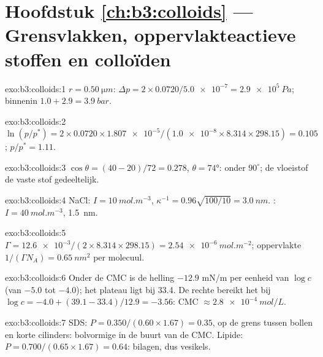\section*{Hoofdstuk \ref{ch:b3:colloids} --- Grensvlakken, oppervlakteactieve stoffen en colloïden}

\begin{solution}{exo:b3:colloids:1}
$r = \qty{0.50}{\micro m}$: $\Delta p = 2 \times 0.0720/\num{5.0e-7} = \qty{2.9e5}{Pa}$; binnenin $1.0 + 2.9 = \qty{3.9}{bar}$.
\end{solution}

\begin{solution}{exo:b3:colloids:2}
$\ln(p/p^*) = 2 \times 0.0720 \times \num{1.807e-5}/(\num{1.0e-8} \times 8.314 \times 298.15) = 0.105$; $p/p^* = 1.11$.
\end{solution}

\begin{solution}{exo:b3:colloids:3}
$\cos\theta = (40 - 20)/72 = 0.278$, $\theta = \ang{74}$: onder $90^\circ$; de vloeistof  de
vaste stof gedeeltelijk.
\end{solution}

\begin{solution}{exo:b3:colloids:4}
NaCl: $I = \qty{10}{mol.m^{-3}}$, $\kappa^{-1} = 0.96\sqrt{100/10} = \qty{3.0}{nm}$. : $I = \qty{40}{mol.m^{-3}}$, \qty{1.5}{nm}.
\end{solution}

\begin{solution}{exo:b3:colloids:5}
$\Gamma = \num{12.6e-3}/(2 \times 8.314 \times 298.15) = \qty{2.54e-6}{mol.m^{-2}}$; oppervlakte $1/(\Gamma N_A) =
\qty{0.65}{nm^2}$ per molecuul.
\end{solution}

\begin{solution}{exo:b3:colloids:6}
Onder de CMC is de helling $-12.9$ \unit{mN/m} per eenheid van $\log c$ (van $-5.0$ tot $-4.0$); het
plateau ligt bij 33.4. De rechte bereikt het bij $\log c = -4.0 + (39.1 - 33.4)/12.9 = -3.56$: CMC
$\approx \qty{2.8e-4}{mol/L}$.
\end{solution}

\begin{solution}{exo:b3:colloids:7}
SDS: $P = 0.350/(0.60 \times 1.67) = 0.35$, op de grens tussen bollen en korte cilinders:
bolvormige  in de buurt van de CMC. Lipide: $P = 0.700/(0.65 \times 1.67) = 0.64$:
bilagen, dus vesikels.
\end{solution}

